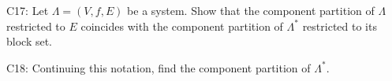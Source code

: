 C17: Let $\Lambda = (V, f, E)$ be a system. Show that the component partition of $\Lambda$ restricted to $E$ coincides with the component partition of $\Lambda^*$ restricted to its block set.

C18: Continuing this notation, find the component partition of $\Lambda^*$.
